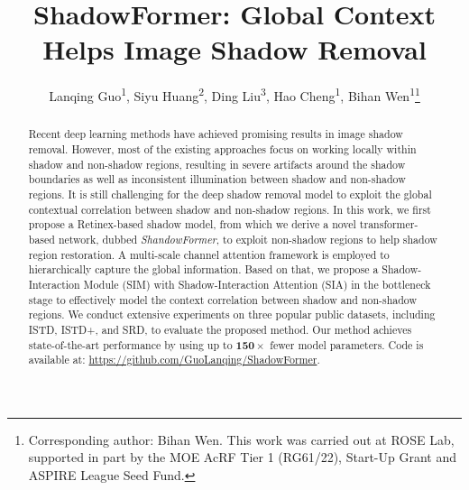 \documentclass[letterpaper]{article} \usepackage{aaai23}  \usepackage{times}  \usepackage{helvet}  \usepackage{courier}  \usepackage[hyphens]{url}  \usepackage{graphicx} \urlstyle{rm} \def\UrlFont{\rm}  \usepackage{natbib}  \usepackage{caption} \frenchspacing  \setlength{\pdfpagewidth}{8.5in} \setlength{\pdfpageheight}{11in} \usepackage{algorithm}
\title{ShadowFormer: Global Context Helps Image Shadow Removal}
\author{Lanqing Guo\textsuperscript{\rm 1},
	Siyu Huang\textsuperscript{\rm 2},
	  Ding Liu\textsuperscript{\rm 3},
  Hao Cheng\textsuperscript{\rm 1},
  Bihan Wen\textsuperscript{\rm 1}\thanks{Corresponding author: Bihan Wen. This work was carried out at ROSE Lab, supported in part by the MOE AcRF Tier 1 (RG61/22), Start-Up Grant and ASPIRE League Seed Fund.}}
\begin{document}
\maketitle


\begin{abstract}
Recent deep learning methods have achieved promising results in image shadow removal.
However, most of the existing approaches focus on working locally within shadow and non-shadow regions, resulting in severe artifacts around the shadow boundaries as well as inconsistent illumination between shadow and non-shadow regions.
It is still challenging for the deep shadow removal model to exploit the global contextual correlation between shadow and non-shadow regions.
In this work, we first propose a Retinex-based shadow model, from which we derive a novel transformer-based network, dubbed \textit{ShandowFormer}, to exploit non-shadow regions to help shadow region restoration.
A multi-scale channel attention framework is employed to hierarchically capture the global information. Based on that,
we propose a Shadow-Interaction Module (SIM) with Shadow-Interaction Attention (SIA) in the bottleneck stage to effectively model the context correlation between shadow and non-shadow regions.
We conduct extensive experiments on three popular public datasets, including ISTD, ISTD+, and SRD, 
to evaluate the proposed method. Our method achieves state-of-the-art performance by using up to $\mathbf{150\times}$ fewer model parameters.
Code is available at: 
\href{https://github.com/GuoLanqing/ShadowFormer}{https://github.com/GuoLanqing/ShadowFormer}.
\end{abstract}
\end{document}
